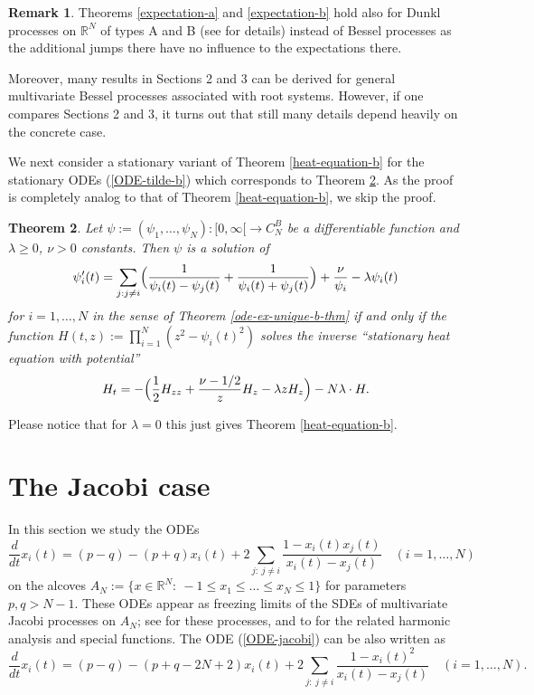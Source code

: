 \documentclass[reqno]{amsart}
\theoremstyle{plain}
\newtheorem{theorem}{Theorem}[section]
\theoremstyle{definition}
\newtheorem{remark}[theorem]{Remark}
\numberwithin{equation}{section}
\begin{document}
\begin{remark}
   Theorems \ref{expectation-a} and \ref{expectation-b} hold also for Dunkl processes on $\mathbb R^N$ of types A and B
  (see \cite{CGY, R1, R2, RV1, V3} for details) instead of Bessel processes as the additional jumps there  have no
  influence to the expectations there.

  Moreover, many results in Sections 2 and 3 can be derived
  for general multivariate Bessel processes associated with  root systems. However, if one compares 
 Sections 2 and 3, it turns out that still many details  depend heavily on the concrete case.
\end{remark}


We next consider a stationary variant of Theorem \ref{heat-equation-b}
for the stationary ODEs (\ref{ODE-tilde-b}) which corresponds to Theorem \ref{heat-equation-b-stat}.
 As the proof is completely analog to that of Theorem \ref{heat-equation-b}, we  skip the proof.

\begin{theorem}\label{heat-equation-b-stat}
  Let $\psi:=(\psi_1,\ldots,\psi_N):[0,\infty[\to C_N^B$ be a differentiable function and $\lambda\ge0$, $\nu>0$  constants.
      Then $\psi$ is a solution of
      \begin{equation}\label{ODE-tilde-b-gen}
\psi^\prime_i(t) = \sum_{j: j\ne i} \Bigl( \frac{1}{\psi_{i}(t)-\psi_{j}(t)}+ \frac{1}{\psi_{i}(t)+\psi_{j}(t)}\Bigr)+\frac{\nu}{\psi_i}
-\lambda\psi_{i}(t)
      \end{equation}
for $i=1,\ldots,N$ in the sense of Theorem \ref{ode-ex-unique-b-thm}
      if and only if the function $H(t,z):=\prod_{i=1}^N (z^2-\psi_i(t)^2)$
      solves the inverse ``stationary heat equation with potential''
      $$H_t=  -\Bigl( \frac{1}{2}H_{zz} + \frac{\nu-1/2}{z}H_z-\lambda z H_{z}\Bigr) -N\lambda\cdot H. $$
\end{theorem}

Please notice that for $\lambda=0$ this just gives Theorem \ref{heat-equation-b}.

 


\section{The Jacobi case}

In this section we study the ODEs
\begin{equation}\label{ODE-jacobi}
\frac{d}{dt}x_i(t)
		=(p-q)-(p+q)x_i(t)
			+2\sum_{j:\> j\neq i}\frac{1-x_i(t)
			x_j(t)}{x_i(t)-x_j(t)}\quad ( i=1,\dots,N)
\end{equation}
on the alcoves $A_N:=\{x\in \mathbb R^N: \> -1\le x_1\le \ldots\le x_N\le 1\}$
for parameters $p,q>N-1$. These ODEs  appear as freezing limits of the SDEs of multivariate Jacobi processes on  $A_N$;
see \cite{De, RR, AVW, RV2, V2, V3} for these processes, and to \cite{HO, HeS}
for the  related harmonic analysis and special functions. The ODE (\ref{ODE-jacobi}) can be also written as
\begin{equation}\label{ODE-jacobi-mod}
  \frac{d}{dt}x_i(t)
		=(p-q)-(p+q-2N+2)x_i(t)
			+2\sum_{j:\> j\neq i}\frac{1-x_i(t)^2}{x_i(t)-x_j(t)}\quad ( i=1,\dots,N).
\end{equation}
\end{document}
